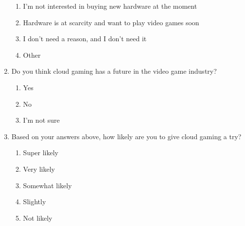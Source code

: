 \begin{enumerate}
\begin{enumerate}
		\item I'm not interested in buying new hardware at the moment
		\item Hardware is at scarcity and want to play video games soon
		\item I don't need a reason, and I don't need it
		\item Other
	\end{enumerate}
	\item Do you think cloud gaming has a future in the video game industry?
	\begin{enumerate}
		\item Yes
		\item No
		\item I'm not sure
	\end{enumerate}
	\item Based on your answers above, how likely are you to give cloud gaming a try?
	\begin{enumerate}
		\item Super likely
		\item Very likely
		\item Somewhat likely
		\item Slightly
		\item Not likely
	\end{enumerate}
	
\end{enumerate}
